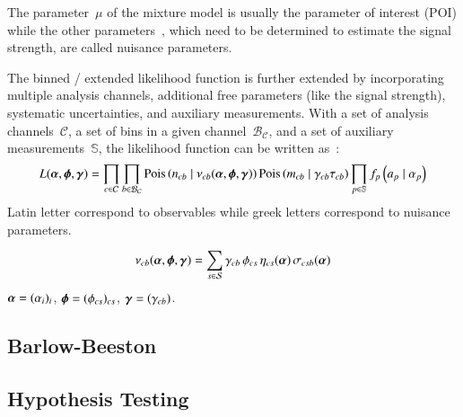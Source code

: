 The parameter~$\mu$ of the mixture model is usually the parameter of
interest (POI) while the other parameters~\boldtheta, which need to be
determined to estimate the signal strength, are called nuisance
parameters.


The binned / extended likelihood function is further extended by
incorporating multiple analysis channels, additional free parameters
(like the signal strength), systematic uncertainties, and auxiliary
measurements. With a set of analysis channels~$\mathcal{C}$, a set of
bins in a given channel~$\mathcal{B}_\mathcal{C}$, and a set of
auxiliary measurements~$\mathbb{S}$, the likelihood function can be
written as~\cite{cranmer2012}:
\begin{align*}
  L(\boldalpha, \boldphi, \boldgamma) =
  \prod_{c \in \mathcal{C}} \prod_{b \in \mathcal{B}_{\mathcal{C}}}
  \mathrm{Pois}\left( n_{cb} \mid \nu_{cb}(\boldalpha, \boldphi, \boldgamma) \right)
  \mathrm{Pois}\left(m_{cb} \mid  \gamma_{cb} \tau_{cb} \right)
  \prod_{p \in \mathbb{S}} f_p\left(a_p \mid \alpha_p \right)
\end{align*}
Latin letter correspond to observables while greek letters correspond
to nuisance parameters.

\begin{align*}
  \nu_{cb}(\boldalpha, \boldphi, \boldgamma) = \sum_{s \in \mathcal{S}} \gamma_{cb} \, \phi_{cs} \, \eta_{cs}(\boldalpha) \, \sigma_{csb}(\boldalpha)
\end{align*}
$\boldalpha = (\alpha_i)_i$, $\boldphi = (\phi_{cs})_{cs}$,
$\boldgamma = (\gamma_{cb})$.




\subsection{Barlow-Beeston}%
\label{sec:barlow_beeston}

\cite{barlow1993,conway2011}


\subsection{Hypothesis Testing}
\label{sec:hypothesis_testing}

